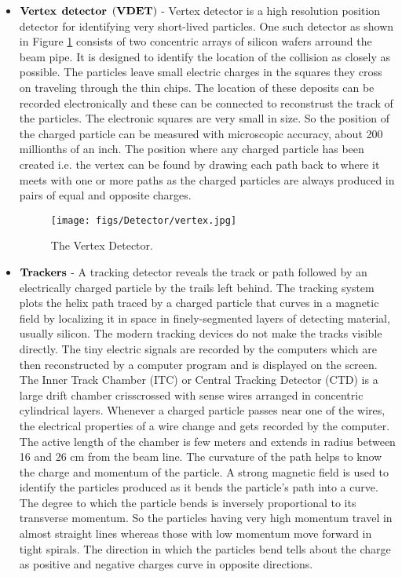 \begin{itemize}
\item
$\bf{Vertex}$ $\bf{detector}$ $\bf{(VDET)}$ - Vertex detector is a high resolution position detector for identifying very short-lived particles. One such detector as shown in Figure \ref{vertex} consists of two concentric arrays of silicon wafers arround the beam pipe. It is designed to identify the location of the collision as closely as possible. The particles leave small electric charges in the squares they cross on traveling through the thin chips. The location of these deposits can be recorded electronically and these can be connected to reconstrust the track of the particles. The electronic squares are very small in size. So the position of the charged particle can be measured with microscopic accuracy, about 200 millionths of an inch. The position where any charged particle has been created i.e. the vertex can be found by drawing each path back to where it meets with one or more paths as the charged particles are always produced in pairs of equal and opposite charges.   
 
\begin{figure}[h!]
\begin{center} 
\texttt{[image: figs/Detector/vertex.jpg]}
\caption{The Vertex Detector.}
\label{vertex}
\end{center}
\end{figure} 

\item
$\bf{Trackers}$ - A tracking detector reveals the track or path followed by an electrically charged particle by the trails left behind. The tracking system plots the helix path traced by a charged particle that curves in a magnetic field by localizing it in space in finely-segmented layers of detecting material, usually silicon. The modern tracking devices do not make the tracks visible directly. The tiny electric signals are recorded by the computers which are then reconstructed by a computer program and is displayed on the screen. The Inner Track Chamber (ITC) or Central Tracking Detector (CTD) is a large drift chamber crisscrossed with sense wires arranged in concentric cylindrical layers. Whenever a charged particle passes near one of the wires, the electrical properties of a wire change and gets recorded by the computer. The active length of the chamber is few meters and extends in radius between 16 and 26 cm from the beam line. The curvature of the path helps to know the charge and momentum of the particle. A strong magnetic field is used to identify the particles produced as it bends the particle's path into a curve. The degree to which the particle bends is inversely proportional to its transverse momentum. So the particles having very high momentum travel in almost straight lines whereas those with low momentum move forward in tight spirals. The direction in which the particles bend tells about the charge as positive and negative charges curve in opposite directions.



\end{itemize}
